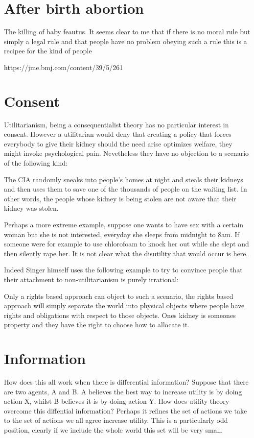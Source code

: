 \documentclass[12pt]{report}
\numberwithin{equation}{section}
\begin{document}
\section{After birth abortion}

The killing of baby feautus. It seems clear to me that if there is no moral rule but simply a legal rule and that people have no problem obeying such a rule this is a recipee for the kind of people 

https://jme.bmj.com/content/39/5/261

\section{Consent}

Utilitarianism, being a consequentialist theory has no particular interest in consent. However a utilitarian would deny that creating a policy that forces everybody to give their kidney should the need arise optimizes welfare, they might invoke psychological pain. Nevetheless they have no objection to a scenario of the following kind:

The CIA randomly sneaks into people's homes at night and steals their kidneys and then uses them to save one of the thousands of people on the waiting list. In other words, the people whose kidney is being stolen are not aware that their kidney was stolen. 

Perhaps a more extreme example, suppose one wants to have sex with a certain woman but she is not interested, everyday she sleeps from midnight to 8am. If someone were for example to use chlorofoam to knock her out while she slept and then silently rape her. It is not clear what the disutility that would occur is here. 

Indeed Singer himself uses the following example to try to convince people that their attachment to non-utilitarianism is purely irrational: 

Only a rights based approach can object to such a scenario, the rights based approach will simply separate the world into physical objects where people have rights and obligations with respect to those objects. Ones kidney is someones property and they have the right to choose how to allocate it. 


\section{Information}

How does this all work when there is differential information? Suppose that there are two agents, A and B. A believes the best way to increase utility is by doing action X, whilst B believes it is by doing action Y. How does utility theory overcome this diffential information? Perhaps it refines the set of actions we take to the set of actions we all agree increase utility. This is a particularly odd position, clearly if we include the whole world this set will be very small. 
\end{document}
